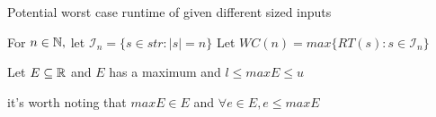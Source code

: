 \documentclass[12pt, letterpaper, twoside]{article}
\begin{document}
Potential worst case runtime of  given different sized inputs\\

For $n \in \mathbb N,$ let $\mathcal{I}_n = \{s \in str : |s| = n\}$
Let $WC(n) = max \{RT(s): s \in \mathcal{I}_n\}$

Let $E \subseteq \mathbb R $ and $E$ has a maximum and $l \le max E \le u$

\hspace*{10mm}it's worth noting that $maxE \in E$ and $\forall e \in E, e \le maxE$
\end{document}
